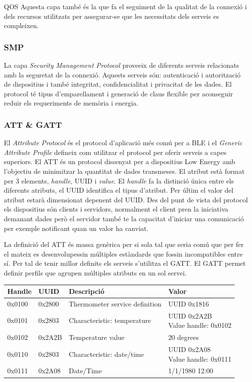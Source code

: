 QOS Aquesta capa també és la que fa el seguiment de la qualitat de la connexió i dels recursos utilitzats per assegurar-se que les necessitats dels serveis es compleixen.

\subsubsection{SMP}
La capa \textit{Security Management Protocol} proveeix de diferents serveis relacionats amb la seguretat de la connexió.
Aquests serveis són: autenticació i autorització de dispositius i també integritat, confidencialitat i privacitat de les dades.
El protocol té tipus d'emparellament i generació de claus flexible per aconseguir reduir els requeriments de memòria i energia.

\subsubsection{ATT \& GATT}
El \textit{Attribute Protocol} és el protocol d'aplicació més comú per a BLE i el \textit{Generic Attribute Profile} defineix com utilitzar el protocol per oferir serveis a capes superiors.
El ATT és un protocol dissenyat per a dispositius Low Energy amb l'objectiu de minimitzar la quantitat de dades transmeses. El atribut està format per 3 elements, \textit{handle}, UUID  i \textit{value}. El \textit{handle} fa la distinció única entre els diferents atributs, el UUID identifica el tipus d'atribut. Per últim el valor del atribut estarà dimensionat depenent del UUID.
Des del punt de vista del protocol els dispositius són clients i servidors, normalment el client pren la iniciativa demanant dades però el servidor també te la capacitat d'iniciar una comunicació per exemple notificant quan un valor ha canviat.

La definició del ATT és massa genèrica per si sola tal que seria comú que per fer el mateix es desenvolupessin múltiples estàndards que fossin incompatibles entre sí.
Per tal de tenir millor definits els serveis s'utilitza el GATT. El GATT permet definir perfils que agrupen múltiples atributs en un sol servei.
\begin{center}
	\begin{tabular}{|l|l|l|l|}
		\hline
		Handle	&	UUID	&	Descripció						&	Valor		\\ 	\hline
		0x0100	&	0x2800	&	Thermometer service definition	&	UUID 0x1816	\\		\hline
		0x0101	&	0x2803	&	Characteristic: temperature		&	\parbox[t]{4cm}{UUID 0x2A2B	\\ Value handle: 0x0102}	\\	\hline
		0x0102	&	0x2A2B	&	Temperature value				&	20 degrees	\\	\hline
		0x0110	&	0x2803	&	Characteristic: date/time		&	\parbox[t]{4cm}{UUID 0x2A08	\\ Value handle: 0x0111}	\\		\hline
		0x0111	&	0x2A08	&	Date/Time						&	1/1/1980 12:00	\\
		\hline
	\end{tabular}
\end{center}


